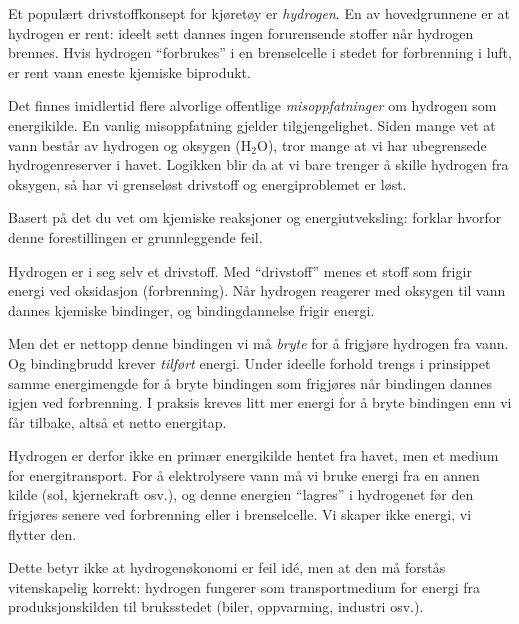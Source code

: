

Et populært drivstoffkonsept for kjøretøy er {\it hydrogen}. En av hovedgrunnene er at hydrogen er rent: ideelt sett dannes ingen forurensende stoffer når hydrogen brennes. Hvis hydrogen ``forbrukes'' i en brenselcelle i stedet for forbrenning i luft, er rent vann eneste kjemiske biprodukt.

Det finnes imidlertid flere alvorlige offentlige {\it misoppfatninger} om hydrogen som energikilde. En vanlig misoppfatning gjelder tilgjengelighet. Siden mange vet at vann består av hydrogen og oksygen (H$_{2}$O), tror mange at vi har ubegrensede hydrogenreserver i havet. Logikken blir da at vi bare trenger å skille hydrogen fra oksygen, så har vi grenseløst drivstoff og energiproblemet er løst.

Basert på det du vet om kjemiske reaksjoner og energiutveksling: forklar hvorfor denne forestillingen er grunnleggende feil.







Hydrogen er i seg selv et drivstoff. Med ``drivstoff'' menes et stoff som frigir energi ved oksidasjon (forbrenning). Når hydrogen reagerer med oksygen til vann dannes kjemiske bindinger, og bindingdannelse frigir energi.

Men det er nettopp denne bindingen vi må {\it bryte} for å frigjøre hydrogen fra vann. Og bindingbrudd krever {\it tilført} energi. Under ideelle forhold trengs i prinsippet samme energimengde for å bryte bindingen som frigjøres når bindingen dannes igjen ved forbrenning. I praksis kreves litt mer energi for å bryte bindingen enn vi får tilbake, altså et netto energitap.

Hydrogen er derfor ikke en primær energikilde hentet fra havet, men et medium for energitransport. For å elektrolysere vann må vi bruke energi fra en annen kilde (sol, kjernekraft osv.), og denne energien ``lagres'' i hydrogenet før den frigjøres senere ved forbrenning eller i brenselcelle. Vi skaper ikke energi, vi flytter den.

Dette betyr ikke at hydrogenøkonomi er feil idé, men at den må forstås vitenskapelig korrekt: hydrogen fungerer som transportmedium for energi fra produksjonskilden til bruksstedet (biler, oppvarming, industri osv.).










